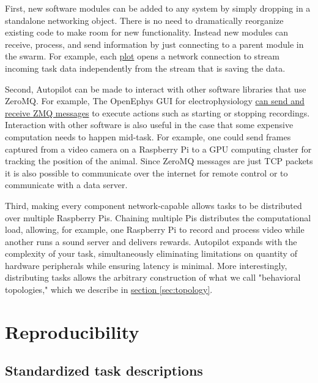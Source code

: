 \documentclass[nohyper, justified, notitlepage, marginals=raggedright,twoside=false,debug]{tufte-autopilot}
\begin{document}
First, new software modules can be added to any system by simply dropping in a standalone networking object. There is no need to dramatically reorganize existing code to make room for new functionality. Instead new modules can receive, process, and send information by just connecting to a parent module in the swarm. For example, each \hyperref[sec:plotting]{plot} opens a network connection to stream incoming task data independently from the stream that is saving the data.

Second, Autopilot can be made to interact with other software libraries that use ZeroMQ. For example, The OpenEphys GUI for electrophysiology \href{https://open-ephys.atlassian.net/wiki/spaces/OEW/pages/23265310/Network+Events}{can send and receive ZMQ messages} to execute actions such as starting or stopping recordings. Interaction with other software is also useful in the case that some expensive computation needs to happen mid-task. For example, one could send frames captured from a video camera on a Raspberry Pi to a GPU computing cluster for tracking the position of the animal. Since ZeroMQ messages are just TCP packets it is also possible to communicate over the internet for remote control or to communicate with a data server.

Third, making every component network-capable allows tasks to be distributed over multiple Raspberry Pis. Chaining multiple Pis distributes the computational load, allowing, for example, one Raspberry Pi to record and process video while another runs a sound server and delivers rewards. Autopilot expands with the complexity of your task, simultaneously eliminating limitations on quantity of hardware peripherals while ensuring latency is minimal. More interestingly, distributing tasks allows the arbitrary construction of what we call "behavioral topologies," which we describe in \hyperref[sec:topology]{section \ref*{sec:topology}}.

\clearpage

\section{Reproducibility}
\label{sec:reproducibility}

\subsection{Standardized task descriptions}
\end{document}
